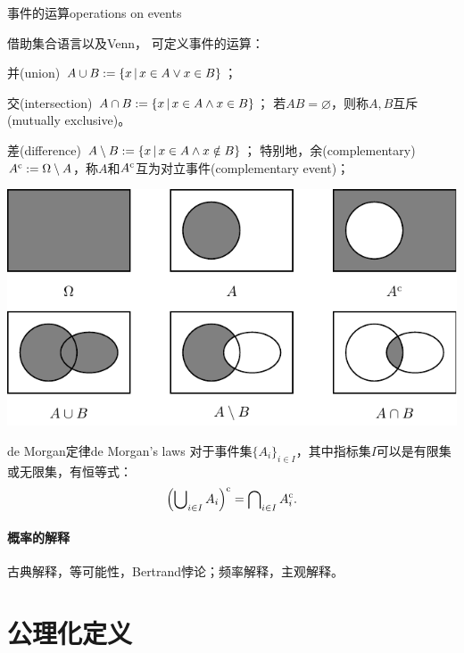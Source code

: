 \begin{definition}
	{事件的运算}{operations on events}
	
	借助集合语言以及Venn，
	可定义事件的运算：
	
	\begin{compactitem}
		\item 并(union) $A\cup B:=\left\{x\,\middle\vert\,x\in A\lor x\in B\right\}$；
		\item 交(intersection) $A\cap B:=\left\{x\,\middle\vert\,x\in A\land x\in B\right\}$；
			\subitem 若$AB=\varnothing$，则称$A,B$互斥(mutually exclusive)。
		\item 差(difference) $A\setminus B:=\left\{x\,\middle\vert\,x\in A\land x\notin B\right\}$；
		\subitem 特别地，余(complementary) $A^\mathrm{c}:=\Omega\setminus A$，称$A$和$A^\mathrm{c}$互为对立事件(complementary event)；
	\end{compactitem}
	
	\begin{center}
		\includegraphics{figures/tikz/venn.pdf}
		\label{fig:venn}
	\end{center}
\end{definition}

\begin{theorem}
	{de Morgan定律}{de Morgan's laws}
	对于事件集$\{A_i\}_{i\in I}$，其中指标集$I$可以是有限集或无限集，有恒等式：
	\[
		\left(\bigcup\nolimits_{i\in I} A_i\right)^\mathrm{c} = \bigcap\nolimits_{i\in I} A_i^\mathrm{c}.
	\]
\end{theorem}

\paragraph{概率的解释}古典解释，等可能性，Bertrand悖论；频率解释，主观解释。

\section{公理化定义}


